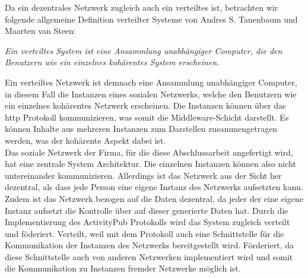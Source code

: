 	Da ein dezentrales Netzwerk zugleich auch ein verteiltes ist, betrachten wir folgende allgemeine Definition verteilter Systeme von Andres S. Tanenbaum und Maarten van Steen:
	\begin{addmargin}[1cm]{1cm}
		\vspace{0.5cm}
		\textit{\glqq Ein verteiltes System ist eine Ansammlung unabhängiger Computer, die den Benutzern wie ein einzelnes kohärentes System erscheinen.\grqq}\cite{distributed-systems}
		\vspace{0.5cm}
	\end{addmargin}
	Ein verteiltes Netzwerk ist demnach eine Ansammlung unabhängiger Computer, in diesem Fall die Instanzen eines sozialen Netzwerks, welche den Benutzern wie ein einzelnes kohärentes Netzwerk erscheinen. Die Instanzen können über das \gls{http} Protokoll kommunizieren, was somit die Middleware-Schicht darstellt. Es können Inhalte aus mehreren Instanzen zum Darstellen zusammengetragen werden, was der kohärente Aspekt dabei ist.\\
	
	Das soziale Netzwerk der Firma, für die diese Abschlussarbeit angefertigt wird, hat eine zentrale System Architektur. Die einzelnen Instanzen können also nicht untereinander kommunizieren. Allerdings ist das Netzwerk aus der Sicht her dezentral, als dass jede Person eine eigene Instanz des Netzwerks aufsetzten kann. Zudem ist das Netzwerk bezogen auf die Daten dezentral, da jeder der eine eigene Instanz aufsetzt die Kontrolle über auf dieser generierte Daten hat. Durch die Implementierung des ActivityPub Protokolls wird das System zugleich verteilt und föderiert. Verteilt, weil mit dem Protokoll auch eine Schnittstelle für die Kommunikation der Instanzen des Netzwerks bereitgestellt wird. Förderiert, da diese Schnittstelle auch von anderen Netzwerken implementiert wird und somit die Kommunikation zu Instanzen fremder Netzwerke möglich ist.

